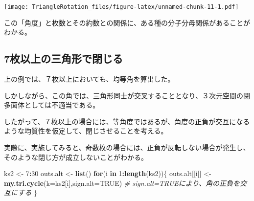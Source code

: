\documentclass[]{article}
\newenvironment{Shaded}{\begin{snugshade}}{\end{snugshade}}
\newcommand{\KeywordTok}[1]{\textcolor[rgb]{0.13,0.29,0.53}{\textbf{#1}}}
\newcommand{\DataTypeTok}[1]{\textcolor[rgb]{0.13,0.29,0.53}{#1}}
\newcommand{\DecValTok}[1]{\textcolor[rgb]{0.00,0.00,0.81}{#1}}
\newcommand{\StringTok}[1]{\textcolor[rgb]{0.31,0.60,0.02}{#1}}
\newcommand{\CommentTok}[1]{\textcolor[rgb]{0.56,0.35,0.01}{\textit{#1}}}
\newcommand{\OtherTok}[1]{\textcolor[rgb]{0.56,0.35,0.01}{#1}}
\newcommand{\ControlFlowTok}[1]{\textcolor[rgb]{0.13,0.29,0.53}{\textbf{#1}}}
\newcommand{\OperatorTok}[1]{\textcolor[rgb]{0.81,0.36,0.00}{\textbf{#1}}}
\newcommand{\NormalTok}[1]{#1}
\begin{document}
\texttt{[image: TriangleRotation\_files/figure-latex/unnamed-chunk-11-1.pdf]}

この「角度」と枚数とその約数との関係に、ある種の分子分母関係があることがわかる。

\subsection{7枚以上の三角形で閉じる}\label{ux679aux4ee5ux4e0aux306eux4e09ux89d2ux5f62ux3067ux9589ux3058ux308b}

上の例では、７枚以上においても、均等角を算出した。

しかしながら、この角では、三角形同士が交叉することとなり、３次元空間の閉多面体としては不適当である。

したがって、７枚以上の場合には、等角度ではあるが、角度の正負が交互になるような均質性を仮定して、閉じさせることを考える。

実際に、実施してみると、奇数枚の場合には、正負が反転しない場合が発生し、そのような閉じ方が成立しないことがわかる。

\begin{Shaded}
\begin{Highlighting}[]
\NormalTok{ks2 <-}\StringTok{ }\DecValTok{7}\OperatorTok{:}\DecValTok{30}
\NormalTok{outs.alt <-}\StringTok{ }\KeywordTok{list}\NormalTok{()}
\ControlFlowTok{for}\NormalTok{(i }\ControlFlowTok{in} \DecValTok{1}\OperatorTok{:}\KeywordTok{length}\NormalTok{(ks2))\{}
\NormalTok{  outs.alt[[i]] <-}\StringTok{ }\KeywordTok{my.tri.cycle}\NormalTok{(}\DataTypeTok{k=}\NormalTok{ks2[i],}\DataTypeTok{sign.alt=}\OtherTok{TRUE}\NormalTok{) }\CommentTok{# sign.alt=TRUEにより、角の正負を交互にする}
\NormalTok{\}}
\end{Highlighting}
\end{Shaded}
\end{document}
